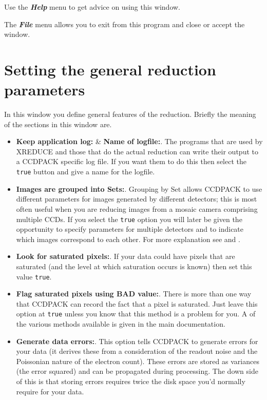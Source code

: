 \documentclass[11pt,nolof]{starlink}
\providecommand{\menu}[1]{{\bf \em #1}}
\providecommand{\wlab}[1]{{\bf #1}}
\providecommand{\text}[1]{{\tt #1}}
\begin{document}
Use the \menu{Help} menu to get advice on using this window.

The \menu{File} menu allows you to exit from this program and close or
accept the window.

\section{Setting\label{CCDSetGenGlobalsWindow}
         the general reduction parameters}
In this window you define general features of the reduction. Briefly
the meaning of the sections in this window are.

\begin{itemize}
\item \wlab{Keep application log:} \& \wlab{Name of logfile:}.
The programs that are used by XREDUCE and those that do the actual
reduction can write their output to a CCDPACK specific log file. If
you want them to do this then select the \text{true} button and give
a name for the logfile.

\item \wlab{Images are grouped into Sets:}.
Grouping by Set allows CCDPACK to use different parameters for images
generated by different detectors; this is most often useful when
you are reducing images from a mosaic camera comprising multiple CCDs.
If you select the \text{true} option you will later be given the opportunity
to specify parameters for multiple detectors and to
indicate which images correspond to each other.
For more explanation see 
and .

\item \wlab{Look for saturated pixels:}. If your data could have pixels
that are saturated (and the level at which saturation occurs is known)
then set this value \text{true}.

\item \wlab{Flag saturated pixels using BAD value:}. There is more than
one way that CCDPACK can record the fact that a pixel is saturated.
Just leave this option at \text{true} unless you know that this method
is a problem for you.  A 
of the various methods available is given in the main documentation.


\item \wlab{Generate data errors:}. This option tells CCDPACK to
generate errors for your data (it derives these from a consideration
of the readout noise and the Poissonian nature of the electron count).
These errors are stored as variances (the error squared) and can be
propagated during processing.  The down side of this is that storing
errors requires twice the disk space you'd normally require for your
data.


\end{itemize}
\end{document}
